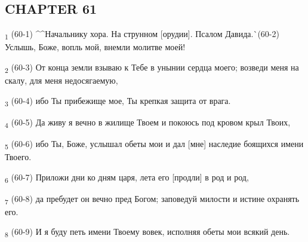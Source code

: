 \subsection{CHAPTER 61}
\begin{tcolorbox}
\textsubscript{1} (60-1) ^^Начальнику хора. На струнном [орудии]. Псалом Давида.^^ (60-2) Услышь, Боже, вопль мой, внемли молитве моей!
\end{tcolorbox}
\begin{tcolorbox}
\textsubscript{2} (60-3) От конца земли взываю к Тебе в унынии сердца моего; возведи меня на скалу, для меня недосягаемую,
\end{tcolorbox}
\begin{tcolorbox}
\textsubscript{3} (60-4) ибо Ты прибежище мое, Ты крепкая защита от врага.
\end{tcolorbox}
\begin{tcolorbox}
\textsubscript{4} (60-5) Да живу я вечно в жилище Твоем и покоюсь под кровом крыл Твоих,
\end{tcolorbox}
\begin{tcolorbox}
\textsubscript{5} (60-6) ибо Ты, Боже, услышал обеты мои и дал [мне] наследие боящихся имени Твоего.
\end{tcolorbox}
\begin{tcolorbox}
\textsubscript{6} (60-7) Приложи дни ко дням царя, лета его [продли] в род и род,
\end{tcolorbox}
\begin{tcolorbox}
\textsubscript{7} (60-8) да пребудет он вечно пред Богом; заповедуй милости и истине охранять его.
\end{tcolorbox}
\begin{tcolorbox}
\textsubscript{8} (60-9) И я буду петь имени Твоему вовек, исполняя обеты мои всякий день.
\end{tcolorbox}
